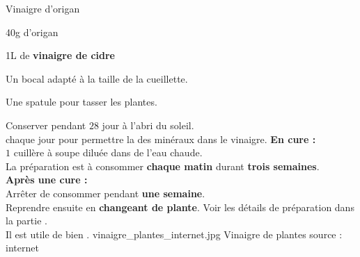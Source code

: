 \ficherecette
{%
    Vinaigre d'origan
}
{%
    \item 40g d'origan
    \item 1L de \textbf{vinaigre de cidre}
}
{%
    \item Un bocal adapté à la taille de la cueillette.
    \item Une spatule pour tasser les plantes.

}
{%
    Conserver pendant $28$ jour à l'abri du soleil. \\
     chaque jour pour permettre la  des minéraux dans le vinaigre.
}
{%
    \textbf{En cure :}\\
    $1$ cuillère à soupe diluée dans de l'eau chaude.\\
    La préparation est à consommer \textbf{chaque matin} durant \textbf{trois semaines}.\\

    \textbf{Après une cure :}\\
    Arrêter de consommer pendant \textbf{une semaine}. \\
    Reprendre ensuite en \textbf{changeant de plante}.
}
{%
    Voir les détails de préparation dans la partie .\\

    Il est utile de bien .
}
{%
    vinaigre_plantes_internet.jpg
}
{%
    Vinaigre de plantes
}
{%
    source : internet
}